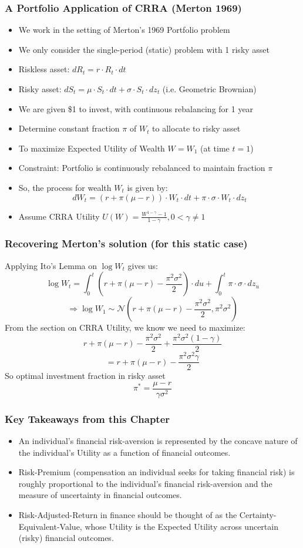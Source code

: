 \documentclass[handout]{beamer}
\begin{document}
\begin{frame}
\frametitle{A Portfolio Application of CRRA (Merton 1969)}
\pause
\begin{itemize}[<+->]
\item We work in the setting of Merton's 1969 Portfolio problem
\item We only consider the single-period (static) problem with 1 risky asset
\item Riskless asset: $dR_t = r \cdot R_t \cdot dt$
\item Risky asset: $dS_t = \mu \cdot S_t \cdot dt + \sigma \cdot S_t \cdot dz_t$ (i.e. Geometric Brownian)
\item We are given \$1 to invest, with continuous rebalancing for 1 year
\item Determine constant fraction $\pi$ of $W_t$ to allocate to risky asset
\item To maximize Expected Utility of Wealth $W = W_1$ (at time $t=1$)
\item Constraint: Portfolio is continuously rebalanced to maintain fraction $\pi$
\item So, the process for wealth $W_t$ is given by:
$$dW_t = (r + \pi (\mu - r)) \cdot W_t \cdot dt + \pi \cdot \sigma \cdot W_t \cdot dz_t$$
\item Assume CRRA Utility $U(W) = \frac {W^{1-\gamma} - 1} {1-\gamma}, 0 < \gamma \neq 1$
\end{itemize}
\end{frame}

\begin{frame}
\frametitle{Recovering Merton's solution (for this static case)}
\pause
Applying Ito's Lemma on $\log W_t$ gives us:
$$\log W_t = \int_0^t (r + \pi (\mu - r) - \frac {\pi^2 \sigma^2} 2) \cdot du + \int_0^t \pi \cdot \sigma \cdot dz_u$$
\pause
$$\Rightarrow \log W_1 \sim \mathcal{N}(r+\pi(\mu -r) - \frac {\pi^2 \sigma^2} 2,  \pi^2 \sigma^2)$$
\pause
From the section on CRRA Utility, we know we need to maximize:
$$r+\pi(\mu -r) - \frac {\pi^2 \sigma^2} 2 + \frac {\pi^2 \sigma^2 (1-\gamma)} 2$$
\pause
$$= r + \pi(\mu - r) - \frac {\pi^2 \sigma^2 \gamma} 2$$
\pause
So optimal investment fraction in risky asset
$$\pi^* = \frac {\mu - r} {\gamma \sigma^2}$$
\end{frame}


\begin{frame}
\frametitle{Key Takeaways from this Chapter}
\pause
\begin{itemize}[<+->]
\item An individual's financial risk-aversion is represented by the concave nature of the individual's Utility as a function of financial outcomes.
\item Risk-Premium (compensation an individual seeks for taking financial risk) is roughly proportional to the individual's financial risk-aversion and the measure of uncertainty in financial outcomes.
\item Risk-Adjusted-Return in finance should be thought of as the Certainty-Equivalent-Value, whose Utility is the Expected Utility across uncertain (risky) financial outcomes.
\end{itemize}
\end{frame}
\end{document}
